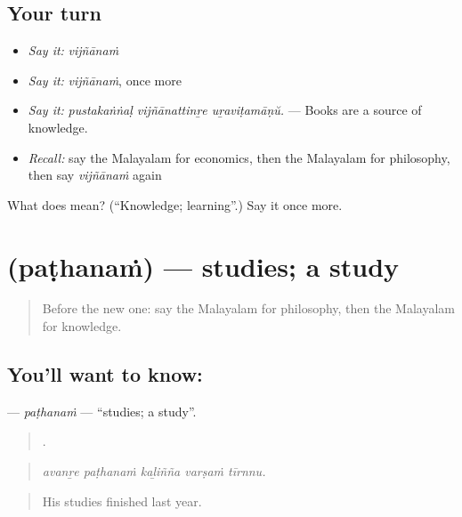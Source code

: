 \subsection*{Your turn}
\begin{itemize}
\raggedright
  \item \emph{Say it:} \emph{vijñānaṁ}
  \item \emph{Say it:} \emph{vijñānaṁ}, once more
  \item \emph{Say it:} \emph{pustakaṅṅaḷ vijñānattinṟe uṟaviṭamāṇŭ.} — Books are a source of knowledge.
  \item \emph{Recall:} say the Malayalam for economics, then the Malayalam for philosophy, then say \emph{vijñānaṁ} again
\end{itemize}

\begin{tcolorbox}[breakable,colback=teal!4,colframe=teal!35!black,title={Before you move on}]
What does  mean? (\textquotedblleft{}Knowledge; learning\textquotedblright{}.) Say it once more.
\end{tcolorbox}
\section[\texorpdfstring{\ml{പഠനം} (paṭhanaṁ)}{പഠനം (paṭhanaṁ)}]{ (paṭhanaṁ) — studies; a study}

\label{lesson:ML-C437-pathanam}



\begin{quote}
Before the new one: say the Malayalam for philosophy, then the Malayalam for knowledge.
\end{quote}

\subsection*{You'll want to know: }
\textbf{} — \emph{paṭhanaṁ} — \textquotedblleft{}studies; a study\textquotedblright{}.

\begin{quote}
    .
\end{quote}

\begin{quote}
\emph{avanṟe paṭhanaṁ kaḻiñña varṣaṁ tīrnnu.}
\end{quote}

\begin{quote}
His studies finished last year.
\end{quote}

